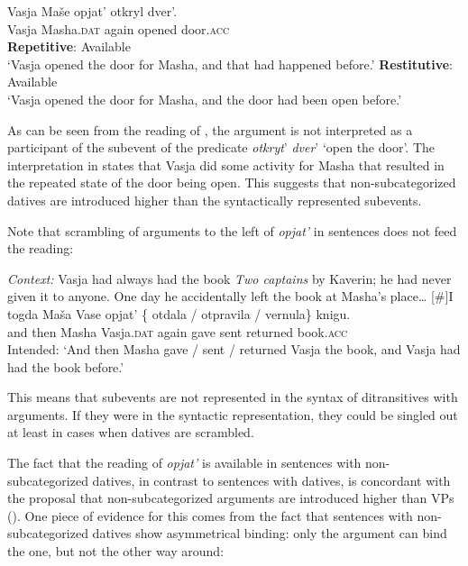 \documentclass[output=paper]{langscibook}
\begin{document}
 \ea\label{ex:bondarenko:32}
\gll Vasja Maše opjat’ otkryl dver’.\\
     Vasja Masha.\textsc{dat} again opened door.\textsc{acc}\\
\ea \textbf{Repetitive}: Available\\
`Vasja opened the door for Masha, and that had happened   before.'
\ex \textbf{Restitutive}: Available\label{ex:bondarenko:32b}\\
`Vasja opened the door for Masha, and the door had been open   before.'
\z\z


\noindent As can be seen from the  reading of , the  argument is not interpreted as a participant of the  subevent of the predicate \textit{otkryt}’ \textit{dver}’ ‘open the door’. The interpretation in  states that Vasja did some activity for Masha that resulted in the repeated state of the door being open. This suggests that non-subcategorized datives are introduced higher than the syntactically represented  subevents.



Note that scrambling of  arguments to the left of \textit{opjat’} in  sentences does not feed the  reading:


 \ea\label{ex:bondarenko:33}
\textit{Context:} Vasja had always had the book \textit{Two captains} by Kaverin; he had never given it to anyone. One day he accidentally left the book at Masha’s place\dots
\exi{}[\#]{\gll I togda Maša Vase opjat’ \{\hspace{-2pt} otdala / otpravila / vernula\} knigu.\\
     and then Masha Vasja.\textsc{dat} again {} gave {} sent {} returned book.\textsc{acc}\\
\glt Intended: `And then Masha gave / sent / returned Vasja the book, and Vasja had had the book before.'}
\z

\noindent This means that  subevents are not represented in the syntax of ditransitives with  arguments. If they were  in the syntactic representation, they could be singled out at least in cases when datives are scrambled.


\largerpage[2]
The fact that the  reading of \textit{opjat’} is available in sentences with non-subcategorized datives, in contrast to  sentences with datives, is concordant with the proposal that non-subcategorized  arguments are introduced higher than VPs (\citealt{Boneh-Nash2017}). One piece of evidence for this comes from the fact that sentences with non-subcategorized datives show asymmetrical binding: only the  argument can bind the  one, but not the other way around:\largerpage
\end{document}
